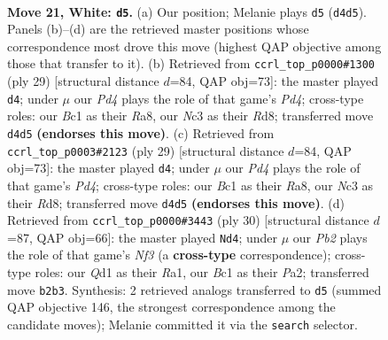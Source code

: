 \documentclass[11pt]{article}
\begin{document}
\clearpage

\begin{figure}[p]\centering
\begin{subfigure}{0.46\textwidth}\centering
\resizebox{\linewidth}{!}{%
\newchessgame
\chessboard[
  setfen={r2q1r2/ppp1b1k1/n4pp1/5b1p/P1pP1N2/2N5/RPP1RPPP/2BQ2K1 w - - 4 21},
  showmover=false,
  pgfstyle=straightmove, color=movearrow, markmove={d4-d5}
]}
\caption{}
\end{subfigure}\hfill
\begin{subfigure}{0.46\textwidth}\centering
\resizebox{\linewidth}{!}{%
\newchessgame
\chessboard[
  setfen={r2r2k1/pp1qbppp/2n2n2/3p4/N6P/4BBP1/PP2PP2/2RQ1RK1 b - - 2 15},
  showmover=false,
  pgfstyle=straightmove, color=movearrow, markmove={d5-d4}
]}
\caption{}
\end{subfigure}
\\[4pt]
\begin{subfigure}{0.46\textwidth}\centering
\resizebox{\linewidth}{!}{%
\newchessgame
\chessboard[
  setfen={r2r2k1/pp1qbppp/2n2n2/3p4/N6P/4BBP1/PP2PP2/2RQ1RK1 b - - 2 15},
  showmover=false,
  pgfstyle=straightmove, color=movearrow, markmove={d5-d4}
]}
\caption{}
\end{subfigure}\hfill
\begin{subfigure}{0.46\textwidth}\centering
\resizebox{\linewidth}{!}{%
\newchessgame
\chessboard[
  setfen={rn3rk1/1pqb1pb1/4p1pp/p1P5/2P1N3/5NP1/PPQ1BP1P/R2R2K1 w - - 1 16},
  showmover=false,
  pgfstyle=straightmove, color=movearrow, markmove={f3-d4}
]}
\caption{}
\end{subfigure}
\caption{\textbf{Move 21, White: \texttt{d5}.} (a) Our position; Melanie plays \texttt{d5} (\texttt{d4d5}). Panels (b)--(d) are the retrieved master positions whose correspondence most drove this move (highest QAP objective among those that transfer to it). (b) Retrieved from \texttt{ccrl\_top\_p0000\#1300} (ply 29) [structural distance $d$=84, QAP obj=73]: the master played \texttt{d4}; under $\mu$ our \emph{Pd4} plays the role of that game's \emph{Pd4}; cross-type roles: our \emph{B}c1 as their \emph{R}a8, our \emph{N}c3 as their \emph{R}d8; transferred move \texttt{d4d5} \textbf{(endorses this move)}. (c) Retrieved from \texttt{ccrl\_top\_p0003\#2123} (ply 29) [structural distance $d$=84, QAP obj=73]: the master played \texttt{d4}; under $\mu$ our \emph{Pd4} plays the role of that game's \emph{Pd4}; cross-type roles: our \emph{B}c1 as their \emph{R}a8, our \emph{N}c3 as their \emph{R}d8; transferred move \texttt{d4d5} \textbf{(endorses this move)}. (d) Retrieved from \texttt{ccrl\_top\_p0000\#3443} (ply 30) [structural distance $d$=87, QAP obj=66]: the master played \texttt{Nd4}; under $\mu$ our \emph{Pb2} plays the role of that game's \emph{Nf3} (a \textbf{cross-type} correspondence); cross-type roles: our \emph{Q}d1 as their \emph{R}a1, our \emph{B}c1 as their \emph{P}a2; transferred move \texttt{b2b3}. Synthesis: 2 retrieved analogs transferred to \texttt{d5} (summed QAP objective 146, the strongest correspondence among the candidate moves); Melanie committed it via the \texttt{search} selector.}
\label{fig:thought-m40}
\end{figure}
\end{document}
